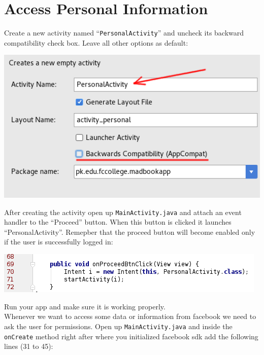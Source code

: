 \section{Access Personal Information}
\label{FBI:accessPersonalInformation}

Create a new activity named ``\texttt{PersonalActivity}'' and uncheck its backward compatibility check box. Leave all other options as default:

\begin{center}
	\includegraphics[scale=\SourceCodeScale]{chapters/ch12/images/28}
\end{center}

After creating the activity open up \texttt{MainActivity.java} and attach an event handler to the ``Proceed'' button. When this button is clicked it launches ``PersonalActivity''. Remepber that the proceed button will become enabled only if the user is successfully logged in:

\begin{center}
	\includegraphics[scale=\SourceCodeScale]{chapters/ch12/images/29}
\end{center}

Run your app and make sure it is working properly. \\

Whenever we want to access some data or information from facebook we need to ask the user for permissions. Open up \texttt{MainActivity.java} and inside the \texttt{onCreate} method right after where you initialized facebook sdk add the following lines (31 to 45):

